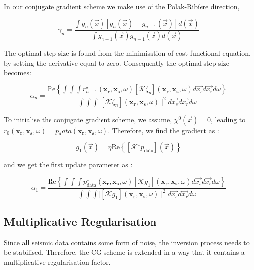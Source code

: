 \documentclass[10pt,a4paper]{article}
\newcommand{\real}[1]{\text{Re} \left\{ #1 \right\}}
\begin{document}
In our conjugate gradient scheme we make use of the Polak-Ribi$\grave{e}$re direction,

\begin{equation} \label{eq:eq16} \gamma_n = \frac{\int g_n(\vec{x})[g_n(\vec{x})-g_{n-1}(\vec{x})]d(\vec{x})}{\int g_{n-1}(\vec{x}) g_{n-1}(\vec{x})d(\vec{x})} \end{equation} 

The optimal step size is found from the minimisation of cost functional equation, by setting the derivative equal to zero. Consequently the optimal step size becomes:

\begin{equation} \label{eq:eq17} \alpha_n = \frac {\real {\int \int \int r^{\star}_{n-1}(\mathbf{x_\text{r}},\mathbf{x_\text{s}},\omega)[\mathcal{K} \zeta_n](\mathbf{x_\text{r}},\mathbf{x_\text{s}},\omega)d\vec{x_s}d\vec{x_r}d\omega}}{\int \int \int \mid[\mathcal{K} \zeta_n](\mathbf{x_\text{r}},\mathbf{x_\text{s}},\omega) \mid^2 d\vec{x_s}d\vec{x_r}d\omega} \end{equation} 

To initialise the conjugate gradient scheme, we assume, $\chi^0 (\vec{x}) = 0$, leading to $r_0(\mathbf{x_\text{r}},\mathbf{x_\text{s}},\omega) = p_data(\mathbf{x_\text{r}},\mathbf{x_\text{s}},\omega)$. Therefore, we find the gradient as :

\begin{equation} \label{eq:eq18} g_1(\vec{x}) = \eta \real{[\mathcal{K}^\star p_\text{data}](\vec{x})} \end{equation} 

and we get the first update parameter as :

\begin{equation} \label{eq:eq19} \alpha_1 = \frac {\real {\int \int \int p^{\star}_\text{data}(\mathbf{x_\text{r}},\mathbf{x_\text{s}},\omega)[\mathcal{K} g_1](\mathbf{x_\text{r}},\mathbf{x_\text{s}},\omega)d\vec{x_s}d\vec{x_r}d\omega}}{\int \int \int \mid[\mathcal{K} g_1](\mathbf{x_\text{r}},\mathbf{x_\text{s}},\omega) \mid^2 d\vec{x_s}d\vec{x_r}d\omega} \end{equation} 


\subsection{Multiplicative Regularisation}

Since all seismic data contains some form of noise, the inversion process needs to be stabilised. Therefore, the CG scheme is extended in a way that it contains a multiplicative regularisation factor. 
\end{document}
